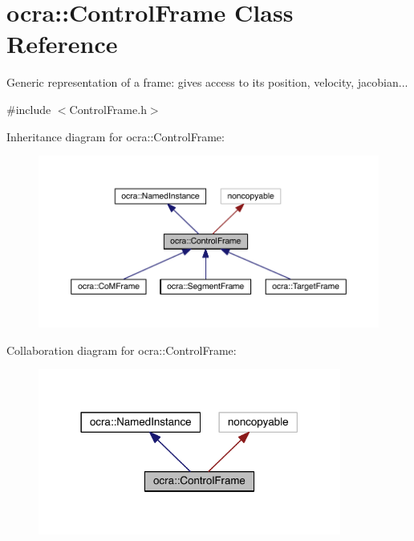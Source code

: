 \hypertarget{classocra_1_1ControlFrame}{}\section{ocra\+:\+:Control\+Frame Class Reference}
\label{classocra_1_1ControlFrame}


Generic representation of a frame\+: gives access to its position, velocity, jacobian...  




{\ttfamily \#include $<$Control\+Frame.\+h$>$}



Inheritance diagram for ocra\+:\+:Control\+Frame\+:\nopagebreak
\begin{figure}[H]
\begin{center}
\leavevmode
\includegraphics[width=350pt]{d6/d24/classocra_1_1ControlFrame__inherit__graph}
\end{center}
\end{figure}


Collaboration diagram for ocra\+:\+:Control\+Frame\+:\nopagebreak
\begin{figure}[H]
\begin{center}
\leavevmode
\includegraphics[width=282pt]{df/dde/classocra_1_1ControlFrame__coll__graph}
\end{center}
\end{figure}
